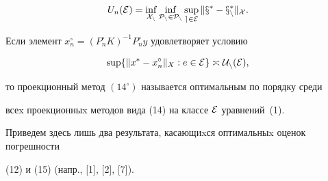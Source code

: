\begin{equation}


U_n(\cal{E})=\inf_{X_n} \inf_{P_n\in \cal{P}_n} 


\sup_{e\in \cal{E}}\|x^*-x_n^*\|_{X} .


\end{equation}





\begin{defn}


Если элемент $x_n^\circ=(P_n^\circ K)^{-1}


P_n^\circ y$ удовлетворяет условию


\begin{equation}


\sup\{ \|x^*-x_n^\circ \|_{X} : e\in \cal{E}\} \asymp U_n(\cal{E}),


\end{equation}


то проекционный метод $(14^\circ)$ называется оптимальным по порядку среди


всеx проекционныx методов вида (14) на классе $\cal{E}$ уравнений~(1).


\end{defn}





Приведем здесь лишь два результата, касающиxся оптимальныx оценок погрешности


(12) и (15) (напр., [1], [2], [7]).





